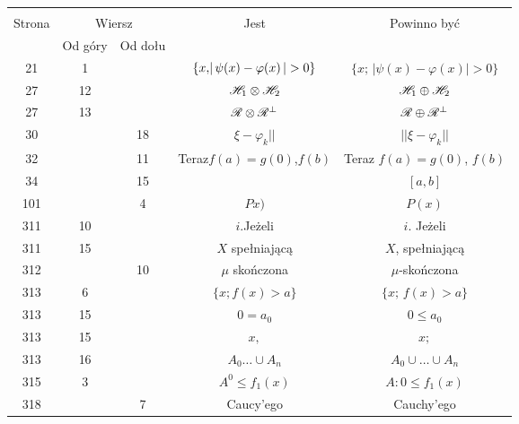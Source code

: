 \documentclass[a4paper,11pt]{article}
\begin{document}
\begin{center}

  \begin{tabular}{|c|c|c|c|c|}
    \hline
    & \multicolumn{2}{c|}{} & & \\
    Strona & \multicolumn{2}{c|}{Wiersz} & Jest
                              & Powinno być \\ \cline{2-3}
    & Od góry & Od dołu & & \\
    \hline
    21  &  1 & & $\{ x ,\! |\, {  \psi( x ) - \varphi( x )  } \,| > 0 \}$
           & $\{ x ;\, | \psi( x ) - \varphi( x )| > 0 \}$ \\
    27  & 12 & & $\mathcal{H}_{ 1 } \otimes \mathcal{H}_{ 2 }$ & $\mathcal{H}_{ 1 } \oplus \mathcal{H}_{ 2 }$ \\
    27  & 13 & & $\mathcal{R} \otimes \mathcal{R}^{ \bot }$ & $\mathcal{R} \oplus \mathcal{R}^{ \bot }$ \\
    30  & & 18 & $\xi - \varphi_{ k } ||$ & $|| \xi - \varphi_{ k } ||$ \\
    32  & & 11 & Teraz$f( a ) = g( 0 )$,$f( b )$
           & Teraz $f( a ) = g( 0 )$, $f( b )$ \\
    34  & & 15 & & $[ a, b ]$ \\
    101 & &  4 & $Px )$ & $P( x )$ \\
    311 & 10 & & $i$.Jeżeli & $i$. Jeżeli \\
    311 & 15 & & $X$ spełniającą & $X$, spełniającą \\
    312 & & 10 & $\mu$ skończona & $\mu$-skończona \\
    313 &  6 & & $\{ x ;\! f( x ) > a \}$ & $\{ x ;\, f( x ) > a \}$ \\
    313 & 15 & & $0 = a_{ 0 }$ & $0 \leq a_{ 0 }$ \\
    313 & 15 & & $x,$ & $x;$ \\
    313 & 16 & & $A_{ 0 } \ldots \cup A_{ n }$
           & $A_{ 0 } \cup \ldots \cup A_{ n }$ \\
    315 & 3 & & $A^{ 0 } \leq f_{ 1 }( x )$ & $A: 0 \leq f_{ 1 }( x )$ \\
    318 & & 7 & Caucy'ego & Cauchy'ego \\
    \hline
  \end{tabular}

\end{center}
\end{document}
